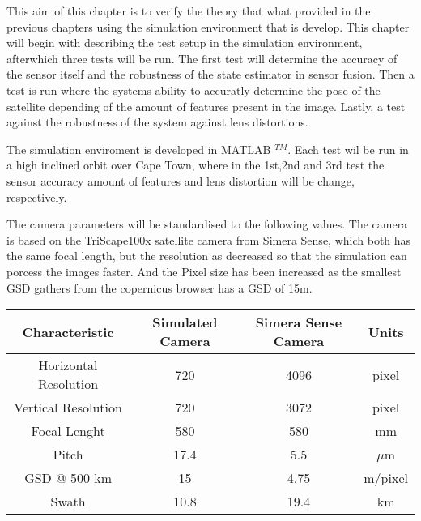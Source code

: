 \label{chap:experiment}

\label{sec:expintro}

This aim of this chapter is to verify the theory that what provided in the previous chapters using the simulation environment that is develop. This chapter will
begin with describing the test setup in the simulation environment, afterwhich three tests will be run. The first test will determine the accuracy of the sensor
itself and the robustness of the state estimator in sensor fusion. Then a test is run where the systems ability to accuratly determine the pose of the satellite depending
of the amount of features present in the image. Lastly, a test against the robustness of the system against lens distortions.

\label{sec:BaseTest}

The simulation enviroment is developed in MATLAB $^{TM}$. Each test wil be run in a high inclined orbit over Cape Town, where in the 1st,2nd and 3rd test the sensor accuracy
amount of features and lens distortion will be change, respectively.
\vspace{0.5cm}

\noindent
The camera parameters will be standardised to the following values. The camera is based on the TriScape100x satellite camera from Simera Sense, which both has the same 
focal length, but the resolution as decreased so that the simulation can porcess the images faster. And the Pixel size has been increased as the smallest GSD gathers from
the copernicus browser has a GSD of 15m.

\begin{table}
    \begin{center}
        \begin{tabular}{|c|c|c|c|}
        \hline
        Characteristic          & Simulated Camera & Simera Sense Camera & Units \\
        \hline
        Horizontal Resolution   & 720   & 4096      & pixel \\
        Vertical Resolution     & 720   & 3072      & pixel \\
        Focal Lenght            & 580   & 580       & mm \\
        Pitch                   & 17.4  & 5.5       & $\mu$m \\
        GSD @ 500 km            & 15    & 4.75      & m/pixel \\
        Swath                   & 10.8  & 19.4      & km \\
        \hline
        \end{tabular}
    \end{center}
\end{table}

